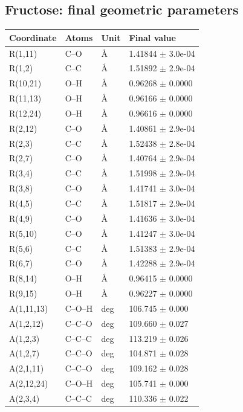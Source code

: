 \subsection{Fructose: final geometric parameters}
\begin{landscape}
\scriptsize
\begin{longtable}{llll}
\toprule
Coordinate & Atoms & Unit & Final value \\
\midrule
\endhead
R(1,11) & C--O & \AA{} & 1.41844 $\pm$ 3.0e-04 \\
R(1,2) & C--C & \AA{} & 1.51892 $\pm$ 2.9e-04 \\
R(10,21) & O--H & \AA{} & 0.96268 $\pm$ 0.0000 \\
R(11,13) & O--H & \AA{} & 0.96166 $\pm$ 0.0000 \\
R(12,24) & O--H & \AA{} & 0.96616 $\pm$ 0.0000 \\
R(2,12) & C--O & \AA{} & 1.40861 $\pm$ 2.9e-04 \\
R(2,3) & C--C & \AA{} & 1.52438 $\pm$ 2.8e-04 \\
R(2,7) & C--O & \AA{} & 1.40764 $\pm$ 2.9e-04 \\
R(3,4) & C--C & \AA{} & 1.51998 $\pm$ 2.9e-04 \\
R(3,8) & C--O & \AA{} & 1.41741 $\pm$ 3.0e-04 \\
R(4,5) & C--C & \AA{} & 1.51817 $\pm$ 2.9e-04 \\
R(4,9) & C--O & \AA{} & 1.41636 $\pm$ 3.0e-04 \\
R(5,10) & C--O & \AA{} & 1.41247 $\pm$ 3.0e-04 \\
R(5,6) & C--C & \AA{} & 1.51383 $\pm$ 2.9e-04 \\
R(6,7) & C--O & \AA{} & 1.42288 $\pm$ 2.9e-04 \\
R(8,14) & O--H & \AA{} & 0.96415 $\pm$ 0.0000 \\
R(9,15) & O--H & \AA{} & 0.96227 $\pm$ 0.0000 \\
A(1,11,13) & C--O--H & deg & 106.745 $\pm$ 0.000 \\
A(1,2,12) & C--C--O & deg & 109.660 $\pm$ 0.027 \\
A(1,2,3) & C--C--C & deg & 113.219 $\pm$ 0.026 \\
A(1,2,7) & C--C--O & deg & 104.871 $\pm$ 0.028 \\
A(2,1,11) & C--C--O & deg & 109.162 $\pm$ 0.028 \\
A(2,12,24) & C--O--H & deg & 105.741 $\pm$ 0.000 \\
A(2,3,4) & C--C--C & deg & 110.336 $\pm$ 0.022 \\

\end{longtable}
\end{landscape}

